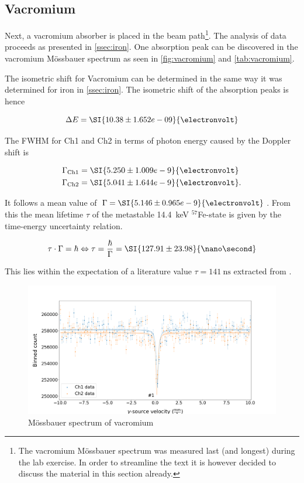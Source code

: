 
\subsection{Vacromium}
\label{ssec:vacromium}

Next, a vacromium absorber is placed in the beam path\footnote{The vacromium
Mössbauer spectrum was measured last (and longest) during the lab exercise. In order
to streamline the text it is however decided to discuss the material in this section
already.}. The analysis of data proceeds as presented in \autoref{ssec:iron}. One
absorption peak can be discovered in the vacromium Mössbauer spectrum as seen in
\autoref{fig:vacromium} and \autoref{tab:vacromium}.

The isometric shift for Vacromium can be determined in the same way it was determined
for iron in \autoref{ssec:iron}. The isometric shift of the absorption peaks is hence

\begin{equation}
\Delta E = \SI{10.38\pm1.652e-09}{\electronvolt}
\end{equation}

The FWHM for Ch1 and Ch2 in terms of photon energy caused by the Doppler shift is

\begin{align*}
\Gamma_\text{Ch1} &= \SI{5.250\pm1.009e-9}{\electronvolt} \\
\Gamma_\text{Ch2} &= \SI{5.041\pm1.644e-9}{\electronvolt}.
\end{align*}

It follows a mean value of $\Gamma = \SI{5.146\pm0.965e-9}{\electronvolt}$. From
this the mean lifetime $\tau$ of the metastable \SI{14.4}{\kilo\electronvolt}
$^{57}$Fe-state is given by the time-energy uncertainty relation.

\begin{equation}
\label{eq:tau-iron}
\tau\cdot\Gamma = \hbar \Leftrightarrow \tau = \frac{\hbar}{\Gamma} = \SI{127.91\pm23.98}{\nano\second}
\end{equation}

This lies within the expectation of a literature value $\tau=\SI{141}{\nano\second}$
extracted from \cite{nishida1981moessbauer}.

\begin{figure}
	\centering
	\includegraphics[width=1.0\textwidth]{./fig/Vacromium.png}
	\caption{Mössbauer spectrum of vacromium}
	\label{fig:vacromium}
\end{figure}


